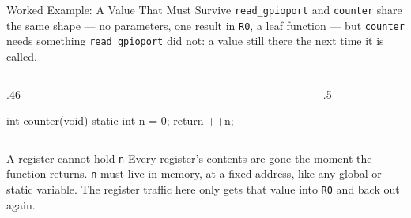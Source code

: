 \documentclass[9pt,aspectratio=169,xcolor=table]{beamer}
\begin{document}
\begin{frame}[fragile]{Worked Example: A Value That Must Survive}
    \leavevmode
    {\small \texttt{read\_gpioport} and \texttt{counter} share the same shape
    --- no parameters, one result in \texttt{R0}, a leaf function --- but
    \texttt{counter} needs something \texttt{read\_gpioport} did not: a value
    still there the \alert{next} time it is called.}

    \vspace{2mm}
    \begin{columns}[T]
    \begin{column}{.46\textwidth}
        \begin{cc}[basicstyle=\normalsize\ttfamily]
int counter(void) {
    static int n = 0;
    return ++n;
}
\end{cc}
    \end{column}
    \begin{column}{.5\textwidth}
    \end{column}
    \end{columns}

    \vspace{3mm}
\begin{block}{A register cannot hold \texttt{n}} Every register's contents are gone the moment the function returns. \texttt{n} must live in \alert{memory}, at a fixed address, like any global or static variable. The register traffic here only gets that value into \texttt{R0} and back out again. \end{block}
\end{frame}
\end{document}
